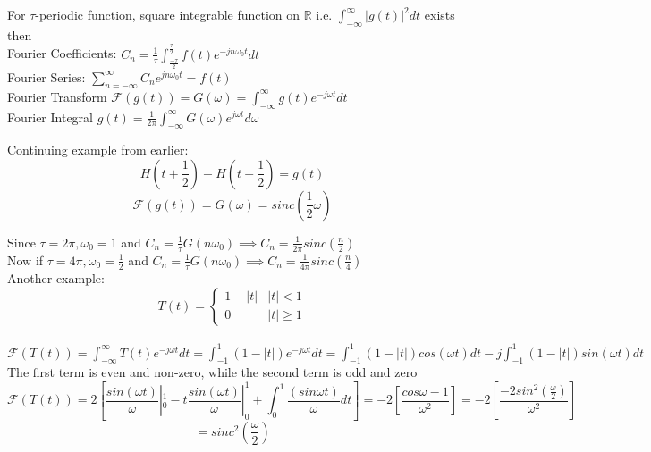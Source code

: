 \documentclass[11pt]{article}
\theoremstyle{definition}
\newcommand{\R}{\mathbb{R}}
\begin{document}
\newpage
For $\tau$-periodic function, square integrable function on $\R$ i.e.  $\int_{-\infty}^{\infty}|g(t)|^2dt$ exists
then\\
Fourier Coefficients: $C_n = \frac{1}{\tau} \int^{\frac{\tau}{2}}_{\frac{-\tau}{2}}f(t)e^{-jn\omega_0 t}dt$\\
Fourier Series: $\sum_{n=-\infty}^\infty C_n e^{jn\omega_0 t} = f(t)$\\
Fourier Transform $\mathcal{F}(g(t)) = G(\omega) = \int_{-\infty}^{\infty}g(t)e^{-j\omega t}dt$\\
Fourier Integral $g(t) = \frac{1}{2\pi} \int_{-\infty}^{\infty}G(\omega)e^{j\omega t}d\omega$

Continuing example from earlier:
$$H(t+\frac{1}{2}) - H(t-\frac{1}{2}) = g(t)$$
$$\mathcal{F}(g(t)) = G(\omega) = sinc(\frac{1}{2}\omega)$$

Since $\tau = 2\pi, \omega_0 = 1$ and $C_n = \frac{1}{\tau}G(n\omega_0) \implies C_n = \frac{1}{2\pi}sinc(\frac{n}{2})$\\
Now if  $\tau = 4\pi, \omega_0 = \frac{1}{2}$ and $C_n = \frac{1}{\tau}G(n\omega_0) \implies C_n = \frac{1}{4\pi}sinc(\frac{n}{4})$\\

Another example:
\[T(t) =  \begin{cases}
      1-|t| & |t| < 1 \\
      0 & |t| \geq 1
   \end{cases}
\]\\
$\mathcal{F}(T(t)) = \int_{-\infty}^{\infty}T(t) e^{-j\omega t}dt = \int_{-1}^{1}(1-|t|) e^{-j\omega t}dt = \int_{-1}^{1}(1-|t|) cos(\omega t)dt - j\int_{-1}^{1}(1-|t|) sin(\omega t)dt$
The first term is even and non-zero, while the second term is odd and zero
$$\mathcal{F}(T(t)) = 2[\frac{sin(\omega t)}{\omega}|^1_0 -t\frac{sin(\omega t)}{\omega}|^1_0 + \int^1_0\frac{(sin\omega t)}{\omega}dt] = -2[\frac{cos\omega - 1 }{\omega^2}] = -2[\frac{-2sin^2(\frac{\omega}{2})}{\omega^2}]$$
$$= sinc^2(\frac{\omega}{2})$$\\
\end{document}

